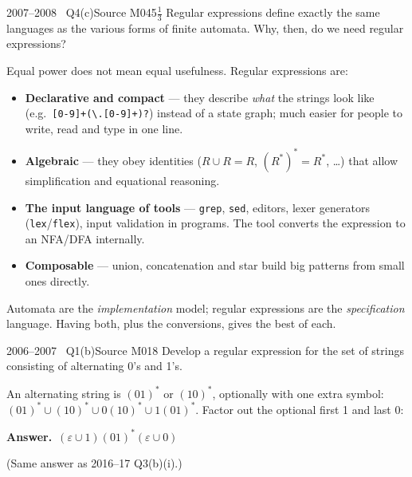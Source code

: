 \documentclass[11pt,a4paper]{article}
\newcommand{\eps}{\varepsilon}
\newcommand{\ans}[1]{\par\smallskip\noindent\colorbox{mist}{\parbox{\dimexpr\linewidth-2\fboxsep}{\sffamily\small\textbf{\color{teal}Answer.}\ \color{ink}#1}}\par}
\begin{document}
\begin{question}{2007--2008 \textbullet\ Q4(c)}{Source M04}{5$\tfrac13$}
Regular expressions define exactly the same languages as the various forms of finite automata. Why, then, do we need regular expressions?
\end{question}
\begin{solution}
Equal power does not mean equal usefulness. Regular expressions are:
\begin{itemize}
\item \textbf{Declarative and compact} --- they describe \emph{what} the strings look like (e.g.\ \texttt{[0-9]+(\textbackslash.[0-9]+)?}) instead of a state graph; much easier for people to write, read and type in one line.
\item \textbf{Algebraic} --- they obey identities ($R\cup R=R$, $(R^*)^*=R^*$, \dots) that allow simplification and equational reasoning.
\item \textbf{The input language of tools} --- \texttt{grep}, \texttt{sed}, editors, lexer generators (\texttt{lex}/\texttt{flex}), input validation in programs. The tool converts the expression to an NFA/DFA internally.
\item \textbf{Composable} --- union, concatenation and star build big patterns from small ones directly.
\end{itemize}
Automata are the \emph{implementation} model; regular expressions are the \emph{specification} language. Having both, plus the conversions, gives the best of each.
\end{solution}

\begin{question}{2006--2007 \textbullet\ Q1(b)}{Source M01}{8}
Develop a regular expression for the set of strings consisting of alternating 0's and 1's.
\end{question}
\begin{solution}
An alternating string is $(01)^*$ or $(10)^*$, optionally with one extra symbol: $(01)^*\cup(10)^*\cup0(10)^*\cup1(01)^*$. Factor out the optional first 1 and last 0:
\ans{$(\eps\cup1)(01)^*(\eps\cup0)$}
(Same answer as 2016--17 Q3(b)(i).)
\end{solution}
\end{document}
